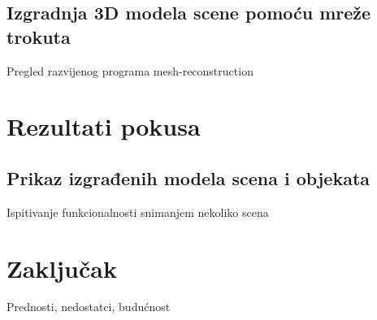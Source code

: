 \documentclass{beamer}
\begin{document}
\subsection{Izgradnja 3D modela scene pomoću mreže trokuta} 
\begin{frame}{Pregled razvijenog programa mesh-reconstruction}
    
\end{frame}

\section{Rezultati pokusa} 
\subsection{Prikaz izgrađenih modela scena i objekata}
\begin{frame}{Ispitivanje funkcionalnosti snimanjem nekoliko scena}

\end{frame}

\section{Zaključak} 
\begin{frame}{Prednosti, nedostatci, budućnost}

\end{frame}
\end{document}
